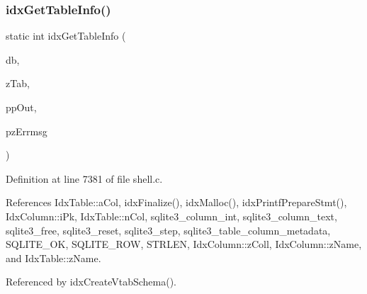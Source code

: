 \mbox{\label{shell_8c_a782164d1f0dca2eb359dd325721fabed}} 
\subsubsection{idx\+Get\+Table\+Info()}
{\footnotesize\ttfamily static int idx\+Get\+Table\+Info (\begin{DoxyParamCaption}\item[{\textbf{ sqlite3} $\ast$}]{db,  }\item[{const char $\ast$}]{z\+Tab,  }\item[{\textbf{ Idx\+Table} $\ast$$\ast$}]{pp\+Out,  }\item[{char $\ast$$\ast$}]{pz\+Errmsg }\end{DoxyParamCaption})\hspace{0.3cm}{\ttfamily [static]}}



Definition at line 7381 of file shell.\+c.



References Idx\+Table\+::a\+Col, idx\+Finalize(), idx\+Malloc(), idx\+Printf\+Prepare\+Stmt(), Idx\+Column\+::i\+Pk, Idx\+Table\+::n\+Col, sqlite3\+\_\+column\+\_\+int, sqlite3\+\_\+column\+\_\+text, sqlite3\+\_\+free, sqlite3\+\_\+reset, sqlite3\+\_\+step, sqlite3\+\_\+table\+\_\+column\+\_\+metadata, S\+Q\+L\+I\+T\+E\+\_\+\+OK, S\+Q\+L\+I\+T\+E\+\_\+\+R\+OW, S\+T\+R\+L\+EN, Idx\+Column\+::z\+Coll, Idx\+Column\+::z\+Name, and Idx\+Table\+::z\+Name.



Referenced by idx\+Create\+Vtab\+Schema().


